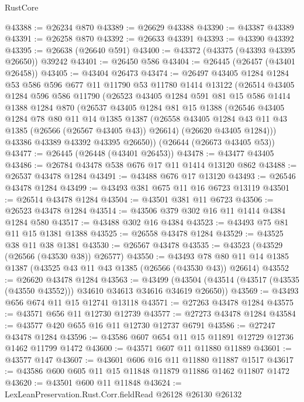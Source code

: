 \begin{lexlean}{RustCore}
\begin{coremodule}
@43388 := @26234 @870
@43389 := @26629 @43388
@43390 := @43387 @43389
@43391 := @26258 @870
@43392 := @26633 @43391
@43393 := @43390 @43392
@43395 := @26638 (@26640 @591)
@43400 := @43372 (@43375 (@43393 @43395 @26650)) @39242
@43401 := @26450 @586
@43404 := @26445 (@26457 (@43401 @26458))
@43405 := @43404 @26473
@43474 := @26497
    @43405
    @1284
    @1284
    @53
    @586
    @596
    @677
    @11
    @11790
    @53
    @11780
    @1414
    @13122
    (@26514
      @43405
      @1284
      @596
      @586
      @11790
      (@26523
        @43405
        @1284
        @591
        @81
        @15
        @586
        @1414
        @1388
        @1284
        @870
        (@26537
          @43405
          @1284
          @81
          @15
          @1388
          (@26546
            @43405
            @1284
            @78
            @80
            @11
            @14
            @1385
            @1387
            (@26558 @43405 @1284 @43 @11 @43 @1385 (@26566 (@26567 @43405 @43)) @26614)
            (@26620 @43405 @1284)))
        @43386
        @43389
        @43392
        @43395
        @26650))
    (@26644 (@26673 @43405 @53))
@43477 := @26445 (@26448 (@43401 @26453))
@43478 := @43477 @43405
@43486 := @26784 @43478 @538 @676 @17 @11 @1414 @13120 @862
@43488 := @26537 @43478 @1284
@43491 := @43488 @676 @17 @13120
@43493 := @26546 @43478 @1284
@43499 := @43493 @381 @675 @11 @16 @6723 @13119
@43501 := @26514 @43478 @1284
@43504 := @43501 @381 @11 @6723
@43506 := @26523 @43478 @1284
@43514 := @43506 @379 @302 @16 @11 @1414 @4384 @1284 @580
@43517 := @43488 @302 @16 @4384
@43523 := @43493 @75 @81 @11 @15 @1381 @1388
@43525 := @26558 @43478 @1284
@43529 := @43525 @38 @11 @38 @1381
@43530 := @26567 @43478
@43535 := @43523 (@43529 (@26566 (@43530 @38)) @26577)
@43550 := @43493 @78 @80 @11 @14 @1385 @1387 (@43525 @43 @11 @43 @1385 (@26566 (@43530 @43)) @26614)
@43552 := @26620 @43478 @1284
@43563 := @43499
    (@43504 (@43514 (@43517 (@43535 (@43550 @43552))) @34610 @34613 @34616 @34619 @26650))
@43569 := @43493 @656 @674 @11 @15 @12741 @13118
@43571 := @27263 @43478 @1284
@43575 := @43571 @656 @11 @12730 @12739
@43577 := @27273 @43478 @1284
@43584 := @43577 @420 @655 @16 @11 @12730 @12737 @6791
@43586 := @27247 @43478 @1284
@43596 := @43586 @607 @654 @11 @15 @11891 @12729 @12736 @1462 @11799 @1472
@43600 := @43571 @607 @11 @11880 @11889
@43601 := @43577 @147
@43607 := @43601 @606 @16 @11 @11880 @11887 @1517
@43617 := @43586 @600 @605 @11 @15 @11848 @11879 @11886 @1462 @11807 @1472
@43620 := @43501 @600 @11 @11848
@43624 := LexLeanPreservation.Rust.Corr.fieldRead @26128 @26130 @26132

\end{coremodule}
\end{lexlean}
